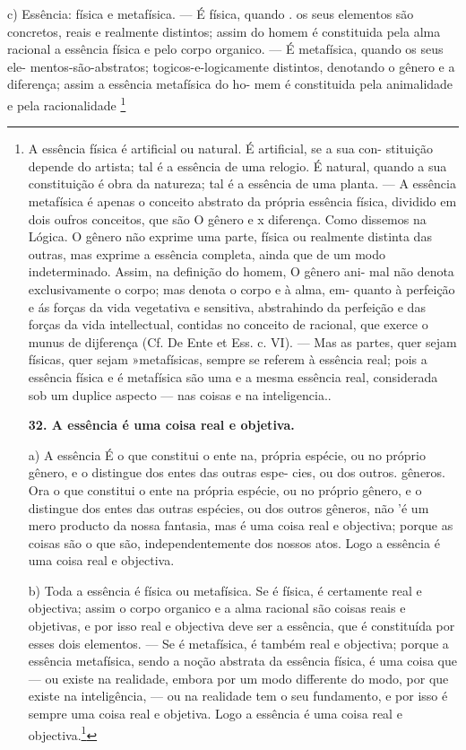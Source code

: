 \documentclass[12pt,a4paper]{article}
\newcommand{\pagmark}[1]{\quad[\textit{p.\,#1}]\quad}
\begin{document}
{{     \medskip\noindent c) Essência: física e metafísica. — É física, quando
. os seus elementos são concretos, reais e realmente distintos; assim
 do homem é constituida pela alma racional
 a essência física
 e pelo corpo organico. — É metafísica, quando os seus ele-
 mentos-são-abstratos; togicos-e-logicamente distintos, denotando
 o gênero e a diferença; assim a essência metafísica do ho-
 mem é constituida pela animalidade e pela racionalidade \footnote{A essência física é artificial ou natural. É artificial, se a sua con-
 stituição depende do artista; tal é a essência de uma relogio. É natural,
 quando a sua constituição é obra da natureza; tal é a essência de uma
 planta. — A essência metafísica é apenas o conceito abstrato da própria
 essência física, dividido em dois oufros conceitos, que são O gênero e x
 diferença. Como dissemos na Lógica. O gênero não exprime uma parte, física
 ou realmente distinta das outras, mas exprime a essência completa, ainda
 que de um modo indeterminado. Assim, na definição do homem, O gênero ani-
 mal não denota exclusivamente o corpo; mas denota o corpo e à alma, em-
 quanto à perfeição e ás forças da vida vegetativa e sensitiva, abstrahindo da
 perfeição e das forças da vida intellectual, contidas no conceito de racional,
 que exerce o munus de dijferença (Cf. De Ente et Ess. c. VI). — Mas as partes,
 quer sejam físicas, quer sejam »metafísicas, sempre se referem à essência
 real; pois a essência física e é metafísica são uma e a mesma essência
 real, considerada sob um duplice aspecto — nas coisas e na inteligencia.. 
\pagmark{304}

\medskip\noindent\textbf{32. A essência é uma coisa real e objetiva.}

     \medskip\noindent a) A essência É o que constitui o ente na, própria espécie,
 ou no próprio gênero, e o distingue dos entes das outras espe-
 cies, ou dos outros. gêneros. Ora o que constitui o ente na
\pagmark{305}
 própria espécie, ou no próprio gênero, e o distingue dos entes
das outras espécies, ou dos outros gêneros, não 'é um mero
producto da nossa fantasia, mas é uma coisa real e objectiva;
porque as coisas são o que são, independentemente dos nossos
atos. Logo a essência é uma coisa real e objectiva.

     \medskip\noindent b) Toda a essência é física ou metafísica. Se é física,
é certamente real e objectiva; assim o corpo organico e a alma
racional são coisas reais e objetivas, e por isso real e objectiva
deve ser a essência, que é constituída por esses dois elementos.
— Se é metafísica, é também real e objectiva; porque a essência
metafísica, sendo a noção abstrata da essência física, é
uma coisa que — ou existe na realidade, embora por um modo
differente do modo, por que existe na inteligência, — ou na realidade tem o seu fundamento, e por isso é sempre uma coisa
real e objetiva. Logo a essência é uma coisa real e objectiva.\footnote{Veja-se o que dissemos na Lógica com relação à objectividade das
ideias universais. — São Os sensualistas e os positivistas, que reduzem a
essência das coisas à mera ficção da nossa fantasia, a nomes ou conceitos
exclusivamente subjectivos, aos quaes nenhuma realidade corresponde.}

}}}
\end{document}

